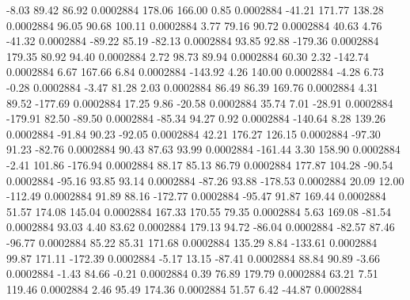        -8.03       89.42       86.92     0.0002884
      178.06      166.00        0.85     0.0002884
      -41.21      171.77      138.28     0.0002884
       96.05       90.68      100.11     0.0002884
        3.77       79.16       90.72     0.0002884
       40.63        4.76      -41.32     0.0002884
      -89.22       85.19      -82.13     0.0002884
       93.85       92.88     -179.36     0.0002884
      179.35       80.92       94.40     0.0002884
        2.72       98.73       89.94     0.0002884
       60.30        2.32     -142.74     0.0002884
        6.67      167.66        6.84     0.0002884
     -143.92        4.26      140.00     0.0002884
       -4.28        6.73       -0.28     0.0002884
       -3.47       81.28        2.03     0.0002884
       86.49       86.39      169.76     0.0002884
        4.31       89.52     -177.69     0.0002884
       17.25        9.86      -20.58     0.0002884
       35.74        7.01      -28.91     0.0002884
     -179.91       82.50      -89.50     0.0002884
      -85.34       94.27        0.92     0.0002884
     -140.64        8.28      139.26     0.0002884
      -91.84       90.23      -92.05     0.0002884
       42.21      176.27      126.15     0.0002884
      -97.30       91.23      -82.76     0.0002884
       90.43       87.63       93.99     0.0002884
     -161.44        3.30      158.90     0.0002884
       -2.41      101.86     -176.94     0.0002884
       88.17       85.13       86.79     0.0002884
      177.87      104.28      -90.54     0.0002884
      -95.16       93.85       93.14     0.0002884
      -87.26       93.88     -178.53     0.0002884
       20.09       12.00     -112.49     0.0002884
       91.89       88.16     -172.77     0.0002884
      -95.47       91.87      169.44     0.0002884
       51.57      174.08      145.04     0.0002884
      167.33      170.55       79.35     0.0002884
        5.63      169.08      -81.54     0.0002884
       93.03        4.40       83.62     0.0002884
      179.13       94.72      -86.04     0.0002884
      -82.57       87.46      -96.77     0.0002884
       85.22       85.31      171.68     0.0002884
      135.29        8.84     -133.61     0.0002884
       99.87      171.11     -172.39     0.0002884
       -5.17       13.15      -87.41     0.0002884
       88.84       90.89       -3.66     0.0002884
       -1.43       84.66       -0.21     0.0002884
        0.39       76.89      179.79     0.0002884
       63.21        7.51      119.46     0.0002884
        2.46       95.49      174.36     0.0002884
       51.57        6.42      -44.87     0.0002884
